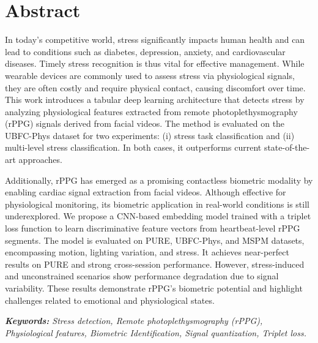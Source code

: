 \chapter*{Abstract}

In today's competitive world, stress significantly impacts human health and can lead to conditions such as diabetes, depression, anxiety, and cardiovascular diseases. Timely stress recognition is thus vital for effective management. While wearable devices are commonly used to assess stress via physiological signals, they are often costly and require physical contact, causing discomfort over time. This work introduces a tabular deep learning architecture that detects stress by analyzing physiological features extracted from remote photoplethysmography (rPPG) signals derived from facial videos. The method is evaluated on the UBFC-Phys dataset for two experiments: (i) stress task classification and (ii) multi-level stress classification. In both cases, it outperforms current state-of-the-art approaches.

Additionally, rPPG has emerged as a promising contactless biometric modality by enabling cardiac signal extraction from facial videos. Although effective for physiological monitoring, its biometric application in real-world conditions is still underexplored. We propose a CNN-based embedding model trained with a triplet loss function to learn discriminative feature vectors from heartbeat-level rPPG segments. The model is evaluated on PURE, UBFC-Phys, and MSPM datasets, encompassing motion, lighting variation, and stress. It achieves near-perfect results on PURE and strong cross-session performance. However, stress-induced and unconstrained scenarios show performance degradation due to signal variability. These results demonstrate rPPG’s biometric potential and highlight challenges related to emotional and physiological states.

\vspace{1em}
\noindent\textit{\textbf{Keywords:} Stress detection, Remote photoplethysmography (rPPG), Physiological features, Biometric Identification, Signal quantization, Triplet loss.}







